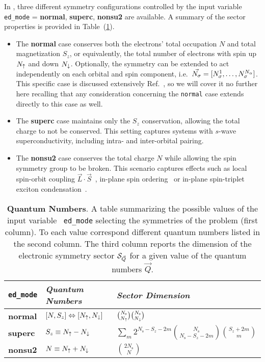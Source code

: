 \documentclass[edipack_sp.tex]{subfiles}
\begin{document}
In \NAME, three different symmetry configurations 
controlled by the input variable {\tt ed\_mode} = {\bf normal}, 
{\bf superc}, {\bf nonsu2} are available. A summary of the sector properties is provided in
Table~(\ref{TabSector}). 

\begin{itemize}
\item{} The {\bf normal} case conserves both the electrons' total occupation $N$
and total magnetization $S_z$, or equivalently, the total number
of electrons with spin up $N_\uparrow$ and down $N_\downarrow$.
Optionally, the symmetry
can be extended to act independently on each orbital and spin
component, i.e.~$\vec{N_\sigma}=[N^1_\sigma,\dots,N^{N_\alpha}_\sigma]$. This
specific case is discussed extensively
Ref.~\cite{Amaricci2022}, so we will cover it no further here recalling that any consideration concerning the {\tt normal} case extends directly to this case as well.

%

\item{} The {\bf superc} case maintains only the $S_z$ conservation,
allowing the total charge to not be conserved. This setting captures
systems with $s$-wave superconductivity, including 
intra- and inter-orbital pairing.

\item{} The {\bf nonsu2} case conserves the total
charge $N$ while allowing the spin symmetry group to be broken.
This scenario captures effects such as local spin-orbit coupling
$\vec{L}\cdot\vec{S}$~\cite{something}, in-plane spin ordering~\cite{BellomiaKMH} or
in-plane spin-triplet exciton condensation~\cite{Amaricci2023_excitons,Blason}.  
\end{itemize}


\begin{table}%
\begin{tabularx}{\linewidth}{ |X|X|X| }
 \hline
  {\tt ed\_mode} & {\it Quantum Numbers} & {\it Sector Dimension} \\
  \hline
  {\bf normal} & $[N,S_z]\Leftrightarrow[N_\uparrow,N_\downarrow]$ &
                                                $\binom{N_\mathrm{s}}{N_\uparrow}\binom{N_\mathrm{s}}{N_\downarrow}$
  \\
  \hline
  {\bf superc} & $S_z\equiv N_\uparrow-N_\downarrow$ &  $\sum_m 2^{N_\mathrm{s}-S_z-2m}\binom{N_\mathrm{s}}{N_\mathrm{s}-S_z-2m}\binom{S_z+2m}{m}$
  \\
  \hline
  {\bf nonsu2} & $N \equiv N_\uparrow+N_\downarrow$ & $\binom{2N_\mathrm{s}}{N}$ \\ 
 \hline  
\end{tabularx}
\vspace{2mm}
\caption{\label{TabSector}
  {\bf Quantum Numbers}.
A table summarizing the possible values of the input variable {\tt
  ed\_mode} selecting the symmetries of the problem (first column). To each value
correspond different quantum numbers listed in the second column.
The third column reports the dimension of the electronic symmetry sector ${\cal S}_{\vec{Q}}$ for a
given value of the quantum numbers $\vec{Q}$.}
\end{table}
\end{document}
